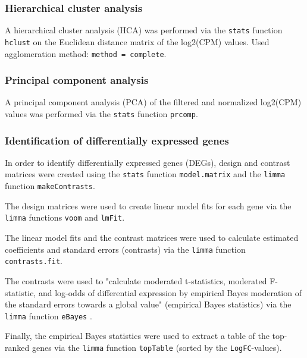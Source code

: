 \subsubsection{Hierarchical cluster analysis}

A hierarchical cluster analysis (HCA) was performed via the \verb|stats| function \verb|hclust| on the Euclidean distance matrix of the log2(CPM) values. Used agglomeration method: \verb|method = complete|.

\subsubsection{Principal component analysis}

A principal component analysis (PCA) of the filtered and normalized log2(CPM) values was performed via the \verb|stats| function \verb|prcomp|.

\subsubsection{Identification of differentially expressed genes}

In order to identify differentially expressed genes (DEGs), design and contrast matrices were created using the \verb|stats| function \verb|model.matrix| and the \verb|limma| function \verb|makeContrasts|.

The design matrices were used to create linear model fits for each gene via the \verb|limma| functions \verb|voom| and \verb|lmFit|.

The linear model fits and the contrast matrices were used to calculate estimated coefficients and standard errors (contrasts) via the \verb|limma| function \verb|contrasts.fit|.

The contrasts were used to "calculate moderated t-statistics, moderated F-statistic, and log-odds of differential expression by empirical Bayes moderation of the standard errors towards a global value" (empirical Bayes statistics) via the \verb|limma| function \verb|eBayes| \autocite{R-limma}.

Finally, the empirical Bayes statistics were used to extract a table of the top-ranked genes via the \verb|limma| function \verb|topTable| (sorted by the \verb|LogFC|-values).

